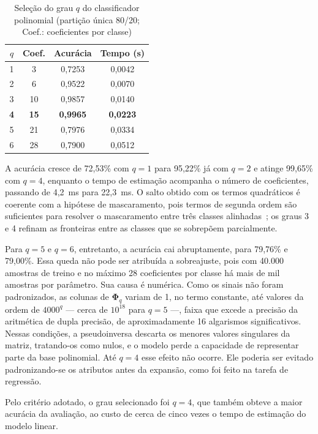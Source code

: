\documentclass[conference]{IEEEtran}
\begin{document}
\begin{table}[htbp]
\caption{Seleção do grau $q$ do classificador polinomial (partição única 80/20; Coef.: coeficientes por classe)}
\begin{center}
\begin{tabular}{|c|c|c|c|}
\hline
\textbf{$q$} & \textbf{Coef.} & \textbf{Acurácia} & \textbf{Tempo (s)} \\
\hline
1 & 3  & 0,7253 & 0,0042 \\
\hline
2 & 6  & 0,9522 & 0,0070 \\
\hline
3 & 10 & 0,9857 & 0,0140 \\
\hline
\textbf{4} & \textbf{15} & \textbf{0,9965} & \textbf{0,0223} \\
\hline
5 & 21 & 0,7976 & 0,0334 \\
\hline
6 & 28 & 0,7900 & 0,0512 \\
\hline
\end{tabular}
\label{tab:q-cls}
\end{center}
\end{table}

A acurácia cresce de 72,53\% com $q = 1$ para 95,22\% já com $q = 2$ e atinge
99,65\% com $q = 4$, enquanto o tempo de estimação acompanha o número de
coeficientes, passando de 4,2~ms para 22,3~ms. O salto obtido com os termos
quadráticos é coerente com a hipótese de mascaramento, pois termos de segunda
ordem são suficientes para resolver o mascaramento entre três classes
alinhadas~\cite{b4}; os graus 3 e 4 refinam as fronteiras entre as classes que
se sobrepõem parcialmente.

Para $q = 5$ e $q = 6$, entretanto, a acurácia cai abruptamente, para 79,76\% e
79,00\%. Essa queda não pode ser atribuída a sobreajuste, pois com 40.000
amostras de treino e no máximo 28 coeficientes por classe há mais de mil
amostras por parâmetro. Sua causa é numérica. Como os sinais não foram
padronizados, as colunas de $\boldsymbol{\Phi}_q$ variam de 1, no termo
constante, até valores da ordem de $4000^q$ --- cerca de $10^{18}$ para
$q = 5$ ---, faixa que excede a precisão da aritmética de dupla precisão, de
aproximadamente 16 algarismos significativos. Nessas condições, a pseudoinversa
descarta os menores valores singulares da matriz, tratando-os como nulos, e o
modelo perde a capacidade de representar parte da base polinomial. Até
$q = 4$ esse efeito não ocorre. Ele poderia ser evitado padronizando-se os
atributos antes da expansão, como foi feito na tarefa de regressão.

Pelo critério adotado, o grau selecionado foi $q = 4$, que também obteve a
maior acurácia da avaliação, ao custo de cerca de cinco vezes o tempo de
estimação do modelo linear.
\end{document}
